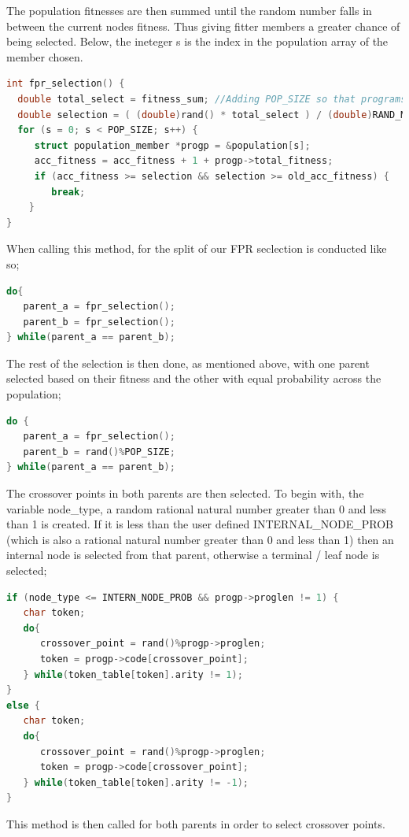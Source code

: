 \documentclass[a4paper,10.5pt]{article}
\begin{document}
The population fitnesses are then summed until the random number falls in between the current nodes fitness. Thus giving fitter members a greater chance of being selected. Below, the ineteger s is the index in the population array of the member chosen.

\begin{lstlisting}[language=C]
int fpr_selection() {
  double total_select = fitness_sum; //Adding POP_SIZE so that programs with 0 entropy still have chance
  double selection = ( (double)rand() * total_select ) / (double)RAND_MAX;
  for (s = 0; s < POP_SIZE; s++) {
     struct population_member *progp = &population[s];
     acc_fitness = acc_fitness + 1 + progp->total_fitness;
     if (acc_fitness >= selection && selection >= old_acc_fitness) {
        break;
    }
}
\end{lstlisting}

When calling this method, for the split of our FPR seclection is conducted like so;

\begin{lstlisting}[language=C]
do{
   parent_a = fpr_selection();
   parent_b = fpr_selection();
} while(parent_a == parent_b);
\end{lstlisting}

The rest of the selection is then done, as mentioned above, with one parent selected based on their fitness and the other with equal probability across the population;

\begin{lstlisting}[language=C]
do {
   parent_a = fpr_selection();
   parent_b = rand()%POP_SIZE;
} while(parent_a == parent_b);
\end{lstlisting}

The crossover points in both parents are then selected. To begin with, the variable node\_type, a random rational natural number greater than 0 and less than 1 is created. If it is less than the user defined INTERNAL\_NODE\_PROB (which is also a rational natural number greater than 0 and less than 1) then an internal node is selected from that parent, otherwise a terminal / leaf node is selected;

\begin{lstlisting}[language=C]
if (node_type <= INTERN_NODE_PROB && progp->proglen != 1) {
   char token;
   do{
      crossover_point = rand()%progp->proglen;
      token = progp->code[crossover_point];
   } while(token_table[token].arity != 1);
}
else {
   char token;
   do{
      crossover_point = rand()%progp->proglen;
      token = progp->code[crossover_point];
   } while(token_table[token].arity != -1);
}
\end{lstlisting}
This method is then called for both parents in order to select crossover points. 
\end{document}
